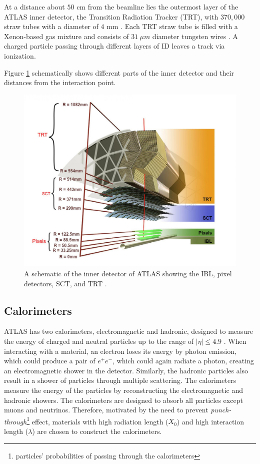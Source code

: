 At a distance about $50$ cm from the beamline lies the outermost layer of the ATLAS inner detector, the Transition Radiation Tracker (TRT), with $370,000$ straw tubes with a diameter of $4$ mm \cite{ID_TRT}. Each TRT straw tube is filled with a Xenon-based gas mixture and consists of $31~\mu m$ diameter tungsten wires \cite{ID_TRT}. A charged particle passing through different layers of ID leaves a track via ionization. 

Figure \ref{fig:ATLAS_ID} schematically shows different parts of the inner detector and their distances from the interaction point.

\begin{figure}[!htb]
    \centering
    \includegraphics[width=.98\linewidth]{figures/LHC/ATLAS_InnerDetector.jpg}
    \caption{ A schematic of the inner detector of ATLAS showing the IBL, pixel detectors, SCT, and TRT \cite{ID_Align_Run2}.\label{fig:ATLAS_ID}}
\end{figure}

\subsection{Calorimeters}
\label{subsec:Cal}

ATLAS has two calorimeters, electromagnetic and hadronic, designed to measure the energy of charged and neutral particles up to the range of $|\eta|\leq4.9$ \cite{ATLAS}. When interacting with a material, an electron loses its energy by photon emission, which could produce a pair of $e^{+}e^{-}$, which could again radiate a photon, creating an electromagnetic shower in the detector. Similarly, the hadronic particles also result in a shower of particles through multiple scattering. The calorimeters measure the energy of the particles by reconstructing the electromagnetic and hadronic showers. The calorimeters are designed to absorb all particles except muons and neutrinos. Therefore, motivated by the need to prevent \textit{punch-through}\footnote{particles' probabilities of passing through the calorimeters} effect, materials with high radiation length ($X_{0}$) and high interaction length ($\lambda$) are chosen to construct the calorimeters.

